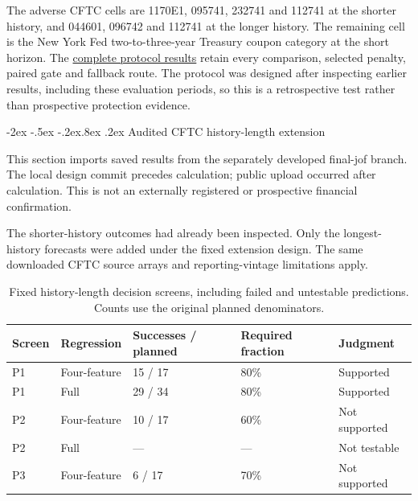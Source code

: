 \documentclass[10pt,a4paper]{article}
\makeatletter
\renewcommand\section{\@startsection{section}{1}{\z@}%
  {-2ex \@plus -.5ex \@minus -.2ex}{.8ex \@plus .2ex}%
  {\normalfont\large\bfseries}}
\makeatother
\begin{document}
The adverse CFTC cells are 1170E1, 095741, 232741 and 112741 at the shorter history, and 044601, 096742 and 112741 at the longer history. The remaining cell is the New York Fed two-to-three-year Treasury coupon category at the short horizon. The \href{https://github.com/ByronLi0207/financial-mathematics-paper-20261020/tree/revision-v13/results/v13/recommended-protocol}{complete protocol results} retain every comparison, selected penalty, paired gate and fallback route. The protocol was designed after inspecting earlier results, including these evaluation periods, so this is a retrospective test rather than prospective protection evidence.


\section{Audited CFTC history-length extension}\label{sup:submission-wp2}

This section imports saved results from the separately developed final-jof branch. The local design commit precedes calculation; public upload occurred after calculation. This is not an externally registered or prospective financial confirmation.

The shorter-history outcomes had already been inspected. Only the longest-history forecasts were added under the fixed extension design. The same downloaded CFTC source arrays and reporting-vintage limitations apply.

\begin{table}[htbp]\centering\small

\caption{Fixed history-length decision screens, including failed and untestable predictions. Counts use the original planned denominators.}\label{tab:submission-wp2}

\begin{tabular}{lllll}\toprule

Screen & Regression & Successes / planned & Required fraction & Judgment\\\midrule

P1 & Four-feature & 15 / 17 & 80\% & Supported\\

P1 & Full & 29 / 34 & 80\% & Supported\\

P2 & Four-feature & 10 / 17 & 60\% & Not supported\\

P2 & Full & --- & --- & Not testable\\

P3 & Four-feature & 6 / 17 & 70\% & Not supported\\

\bottomrule\end{tabular}\end{table}
\end{document}
